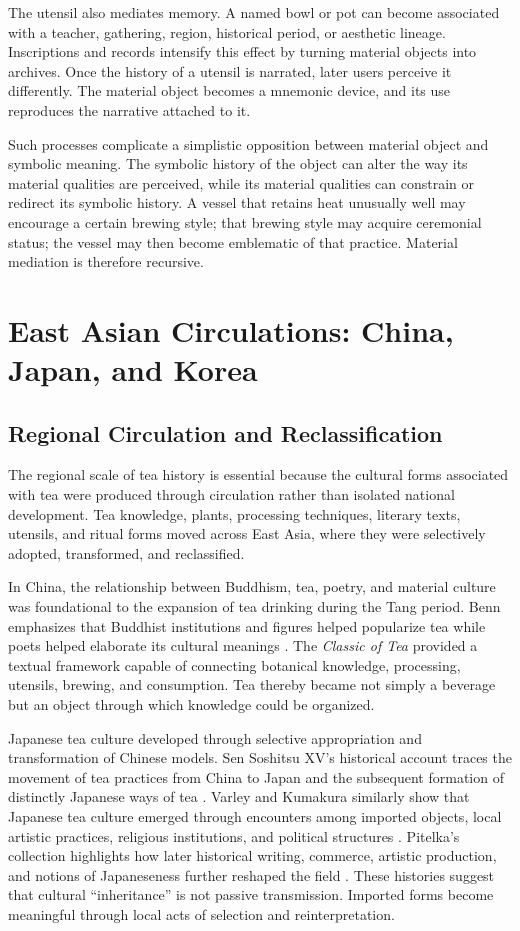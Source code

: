 \documentclass[numbers]{IntechOpen-Book}
\begin{document}
The utensil also mediates memory. A named bowl or pot can become associated with a teacher, gathering, region, historical period, or aesthetic lineage. Inscriptions and records intensify this effect by turning material objects into archives. Once the history of a utensil is narrated, later users perceive it differently. The material object becomes a mnemonic device, and its use reproduces the narrative attached to it.

Such processes complicate a simplistic opposition between material object and symbolic meaning. The symbolic history of the object can alter the way its material qualities are perceived, while its material qualities can constrain or redirect its symbolic history. A vessel that retains heat unusually well may encourage a certain brewing style; that brewing style may acquire ceremonial status; the vessel may then become emblematic of that practice. Material mediation is therefore recursive.

\section{East Asian Circulations: China, Japan, and Korea}

\subsection{Regional Circulation and Reclassification}

The regional scale of tea history is essential because the cultural forms associated with tea were produced through circulation rather than isolated national development. Tea knowledge, plants, processing techniques, literary texts, utensils, and ritual forms moved across East Asia, where they were selectively adopted, transformed, and reclassified.

In China, the relationship between Buddhism, tea, poetry, and material culture was foundational to the expansion of tea drinking during the Tang period. Benn emphasizes that Buddhist institutions and figures helped popularize tea while poets helped elaborate its cultural meanings \cite{benn,bennpoetry}. The \textit{Classic of Tea} provided a textual framework capable of connecting botanical knowledge, processing, utensils, brewing, and consumption. Tea thereby became not simply a beverage but an object through which knowledge could be organized.

Japanese tea culture developed through selective appropriation and transformation of Chinese models. Sen Soshitsu XV's historical account traces the movement of tea practices from China to Japan and the subsequent formation of distinctly Japanese ways of tea \cite{sen}. Varley and Kumakura similarly show that Japanese tea culture emerged through encounters among imported objects, local artistic practices, religious institutions, and political structures \cite{varley}. Pitelka's collection highlights how later historical writing, commerce, artistic production, and notions of Japaneseness further reshaped the field \cite{pitelka}. These histories suggest that cultural ``inheritance'' is not passive transmission. Imported forms become meaningful through local acts of selection and reinterpretation.
\end{document}
